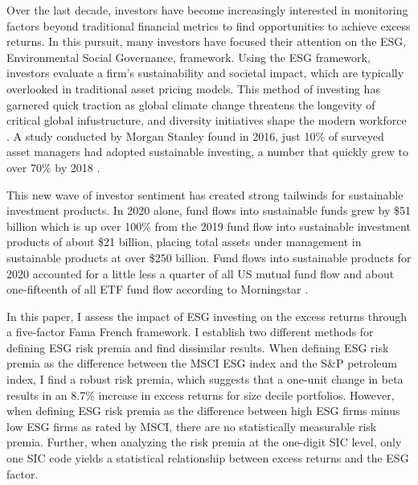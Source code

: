 Over the last decade, investors have become increasingly interested in monitoring factors beyond traditional financial metrics to find opportunities to achieve excess returns. In this pursuit,  many investors have focused their attention on the ESG, Environmental Social Governance, framework. Using the ESG framework, investors evaluate a firm's sustainability and societal impact, which are typically overlooked in traditional asset pricing models. This method of investing has garnered quick traction as global climate change threatens the longevity of critical global infustructure, and diversity initiatives shape the modern workforce  \cite{holder_three-degree_nodate, mckinsey_diversity}. A study conducted by Morgan Stanley found in 2016, just 10\% of surveyed asset managers had adopted sustainable investing, a number that quickly grew to over 70\% by 2018 \cite{morgan_stanley_sustainable_2019}. 

This new wave of investor sentiment has created strong tailwinds for sustainable investment products. In 2020 alone, fund flows into sustainable funds grew by \$51 billion  which is up over 100\% from the 2019 fund flow into sustainable investment products of about \$21 billion, placing total assets under management in sustainable products at over \$250 billion. Fund flows into sustainable products for 2020 accounted for a little less a quarter of all US mutual fund flow and about one-fifteenth of all ETF fund flow according to Morningstar \cite{monring_star_ESG}.

In this paper, I assess the impact of ESG investing on the excess returns through a five-factor Fama French framework. I establish two different methods for defining ESG risk premia and find dissimilar results. When defining ESG risk premia as the difference between the MSCI ESG index and the S\&P petroleum index, I find a robust risk premia, which suggests that a one-unit change in beta results in an 8.7\% increase in excess returns for size decile portfolios. However, when defining ESG risk premia as the difference between high ESG firms minus low ESG firms as rated by MSCI, there are no statistically measurable risk premia. Further, when analyzing the risk premia at the one-digit SIC level, only one SIC code yields a statistical relationship between excess returns and the ESG factor. 
